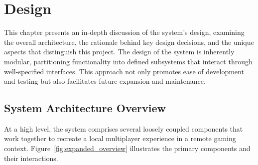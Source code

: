 \chapter{Design}
\label{chapter:design}

This chapter presents an in-depth discussion of the system's design, examining
the overall architecture, the rationale behind key design decisions, and the
unique aspects that distinguish this project. The design of the system is
inherently modular, partitioning functionality into defined subsystems that
interact through well-specified interfaces. This approach not only promotes ease
of development and testing but also facilitates future expansion and
maintenance.

\section{System Architecture Overview}

At a high level, the system comprises several loosely coupled components that
work together to recreate a local multiplayer experience in a remote gaming
context. Figure~\ref{fig:expanded_overview} illustrates the primary components
and their interactions.

